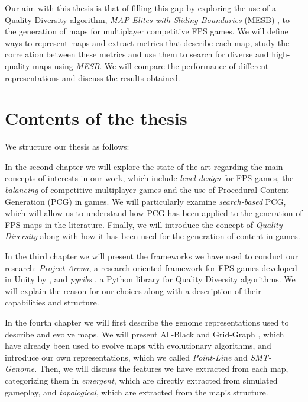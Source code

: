 Our aim with this thesis is that of filling this gap by exploring the use of a Quality Diversity algorithm, \textit{MAP-Elites with Sliding Boundaries} (MESB) \cite{fontaine_mapping_2019}, to the generation of maps for multiplayer competitive FPS games. We will define ways to represent maps and extract metrics that describe each map, study the correlation between these metrics and use them to search for diverse and high-quality maps using \textit{MESB}. We will compare the performance of different representations and discuss the results obtained.

\section{Contents of the thesis}
We structure our thesis as follows:

In the second chapter we will explore the state of the art regarding the main concepts of interests in our work, which include \textit{level design} for FPS games, the \textit{balancing} of competitive multiplayer games and the use of Procedural Content Generation (PCG) in games. We will particularly examine \textit{search-based} PCG, which will allow us to understand how PCG has been applied to the generation of FPS maps in the literature. Finally, we will introduce the concept of \textit{Quality Diversity} along with how it has been used for the generation of content in games.

In the third chapter we will present the frameworks we have used to conduct our research: \textit{Project Arena}, a research-oriented framework for FPS games developed in Unity by \citet{ballabio_online_2018}, and \textit{pyribs} \cite{tjanaka_pyribs_2023}, a Python library for Quality Diversity algorithms. We will explain the reason for our choices along with a description of their capabilities and structure. 

In the fourth chapter we will first describe the genome representations used to describe and evolve maps. We will present All-Black \cite{cardamone_evolving_2011} and Grid-Graph \cite{bari_evolutionary-based_2023}, which have already been used to evolve maps with evolutionary algorithms, and introduce our own representations, which we called \textit{Point-Line} and \textit{SMT-Genome}. Then, we will discuss the features we have extracted from each map, categorizing them in \textit{emergent}, which are directly extracted from simulated gameplay, and \textit{topological}, which are extracted from the map's structure.


